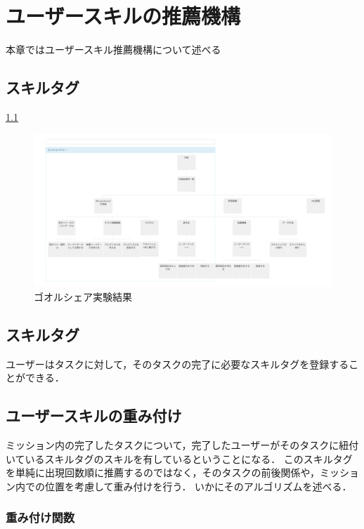 \chapter{ユーザースキルの推薦機構}
本章ではユーザースキル推薦機構について述べる

\section{スキルタグ}

\ref{img:large_mission}

\begin{figure}[t]
	\begin{center}
		\includegraphics[width=0.9\linewidth]{assets/img/large_mission.png}
		\caption{ゴオルシェア実験結果}
		\label{img:large_mission}
	\end{center}
\end{figure}

\section{スキルタグ}
ユーザーはタスクに対して，そのタスクの完了に必要なスキルタグを登録することができる．

\section{ユーザースキルの重み付け}
ミッション内の完了したタスクについて，完了したユーザーがそのタスクに紐付いているスキルタグのスキルを有しているということになる．
このスキルタグを単純に出現回数順に推薦するのではなく，そのタスクの前後関係や，ミッション内での位置を考慮して重み付けを行う．
いかにそのアルゴリズムを述べる．

\subsection{重み付け関数}
